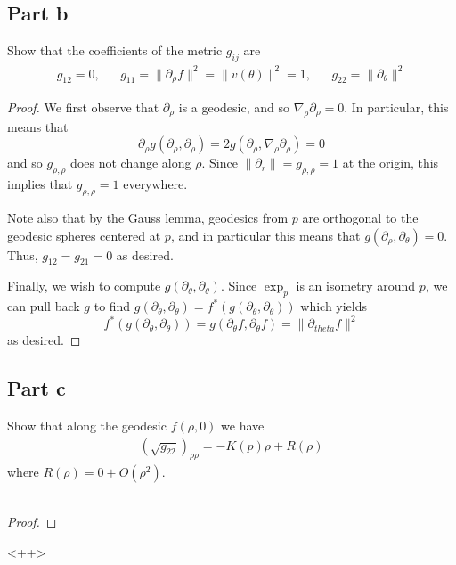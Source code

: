 \documentclass[fontsize=11pt]{scrartcl} %
\numberwithin{equation}{section} %
\numberwithin{figure}{section} %
\numberwithin{table}{section} %
\begin{document}
\subsection*{Part b}
Show that the coefficients of the metric $g_{ij}$ are
\[
    \begin{aligned}
        g_{12}=0,& &g_{11}=\|\partial_{\rho}f\|^2 = \|v(\theta)\|^2=1,&
        &g_{22}=\|\partial_{\theta}\|^2
    \end{aligned}
\]

\begin{proof}
    We first observe that $\partial_{\rho}$ is a geodesic, and so
    $\nabla_{\rho}\partial_{\rho} = 0$. In particular, this means that
    \[
        \partial_{\rho}g(\partial_\rho,\partial_{\rho}) =
        2g(\partial_{\rho},\nabla_{\rho}\partial_{\rho}) = 0
    \]
    and so $g_{\rho,\rho}$ does not change along $\rho$. Since $\|\partial_r\| =
    g_{\rho,\rho} = 1$ at the origin, this implies that $g_{\rho,\rho}=1$
    everywhere.

    Note also that by the Gauss lemma, geodesics from $p$ are orthogonal to the
    geodesic spheres centered at $p$, and in
    particular this means that $g(\partial_{\rho},\partial_{\theta}) = 0$. Thus,
    $g_{12}=g_{21}=0$ as desired.

    Finally, we wish to compute $g(\partial_{\theta},\partial_{\theta})$.
    Since $\exp_p$ is an isometry around $p$, we can pull back $g$ to find
    $g(\partial_{\theta},\partial_{\theta}) =
    f^*(g(\partial_{\theta},\partial_{\theta}))$ which yields
        \[
            f^*(g(\partial_{\theta},\partial_{\theta})) =
            g(\partial_{\theta}f,\partial_{\theta}f) = \|\partial_{theta}f\|^2
        \]
    as desired.
\end{proof}

\subsection*{Part c}
Show that along the geodesic $f(\rho,0)$ we have
\[
\begin{aligned}
    (\sqrt{g_{22}})_{\rho\rho} = -K(p)\rho + R(\rho)
\end{aligned}
\]
where $R(\rho) = 0 + O(\rho^2)$.
\\
\\
\begin{proof}
    
\end{proof}<++>
\end{document}
